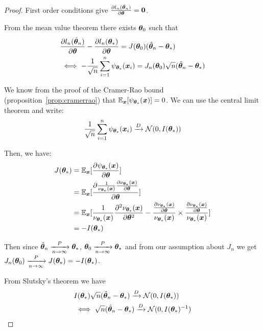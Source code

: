 \begin{proof}

  First order conditions give $\partialfrac{\thetab}{l_n(\hat{\thetab}_n)} = \bzero$.

  From the mean value theorem there exists $\thetab_0$ such that
  \begin{align}
    &\partialfrac{\thetab}{l_n(\hat{\thetab}_n)} - \partialfrac{\thetab}{l_n(\thetab_*)} = J(\thetab_0)(\hat{\thetab}_n - \thetab_*) \\
    &\iff -\frac1{\sqrt{n}} \sum_{i=1}^n  \psi_{\thetab_*}(\xb_i) = J_n(\thetab_0)\sqrt{n}(\hat{\thetab}_n - \thetab_*)
  \end{align}

  We know from the proof of the Cramer-Rao bound
  (proposition~\ref{prop:cramerrao}) that $\EE_{\xb} [\psi_{\thetab_*}(\xb)]=
  0$.  We can use the central limit theorem and write:
  \begin{align}
  \frac1{\sqrt{n}} \sum_{i=1}^n  \psi_{\thetab_*}(\xb_i) \xrightarrow[]{D}
  \Ncal(0, I(\thetab_*))
  \end{align}

  Then, we have:
  \begin{align}
  J(\thetab_*) &= \EE_{\xb}[\partialfrac{\thetab}{\psi_{\thetab_*}(\xb)}] \\
              &=  \EE_{\xb} [\partialfrac{\thetab}{ \frac1{\nu_{\thetab_*}(\xb)} \partialfrac{\thetab}{ \nu_{\thetab_*}(\xb)}} ] \\
              &= \EE_{\xb}[\frac1{\nu_{\thetab_*}(\xb)} \partialfrac{\thetab^2}{^2 \nu_{\thetab_*}(\xb)}-\frac{\partialfrac{\thetab}{ \nu_{\thetab_*}(\xb)}}{\nu_{\thetab_*}(\xb)}  \times  \frac{\partialfrac{\thetab}{\nu_{\thetab_*}(\xb)}}{\nu_{\thetab_*}(\xb)}  ] \\
              &= - I(\thetab_*) \\
  \end{align}

  Then since $\hat{\thetab}_n \xrightarrow[n \rightarrow \infty]{P} \thetab_*$, $\thetab_0
  \xrightarrow[n \rightarrow \infty]{P} \thetab_*$ and from our assumption about
  $J_n$ we get
  $J_n(\thetab_0) \xrightarrow[n \rightarrow \infty]{P} J(\thetab_*) =
  -I(\thetab_*)$.

  From Slutsky's theorem we have
  \begin{align}
    &I(\thetab_*) \sqrt{n}(\hat{\thetab}_n - \thetab_*) \xrightarrow[]{D}\Ncal(0, I(\thetab_*)) \\
    &\iff \sqrt{n}(\hat{\thetab}_n - \thetab_*) \xrightarrow[]{D}\Ncal(0, I(\thetab_*)^{-1})
  \end{align}
\end{proof}

